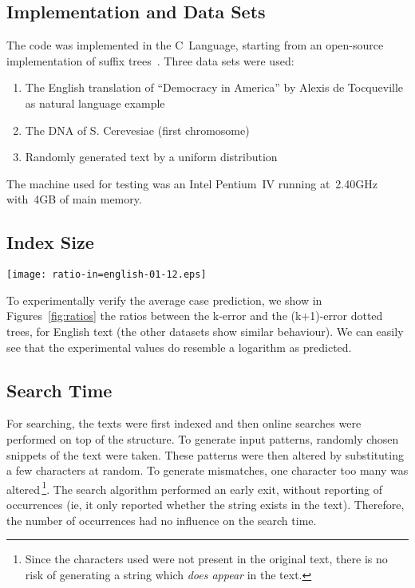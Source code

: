\subsection{Implementation and Data Sets}

The code was implemented in the C~Language, starting from an open-source implementation of suffix trees~\cite{ansicimplementation}. Three data sets were used:

\begin{enumerate}
\item The English translation of ``Democracy in America'' by Alexis de Tocqueville as natural language example
\item The DNA of S. Cerevesiae (first chromosome)
\item Randomly generated text by a uniform distribution
\end{enumerate}

The machine used for testing was an Intel Pentium~IV running at~2.40GHz with~4GB of main memory.

\subsection{Index Size}

\begin{figure*}%
\centering
\texttt{[image: ratio-in=english-01-12.eps]}%
\caption{Ratio of number of nodes in k-error and (k+1)-error dotted trees}\label{fig:ratios}%
\end{figure*}

To experimentally verify the average case prediction, we show in Figures~\ref{fig:ratios} the ratios between the k-error and the (k+1)-error dotted trees, for English text (the other datasets show similar behaviour). We can easily see that the experimental values do resemble a logarithm as predicted.

\subsection{Search Time}

For searching, the texts were first indexed and then online searches were performed on top of the structure. To generate input patterns, randomly chosen snippets of the text were taken. These patterns were then altered by substituting a few characters at random. To generate mismatches, one character too many was altered\,\footnote{Since the characters used were not present in the original text, there is no risk of generating a string which \emph{does appear} in the text.}. The search algorithm performed an early exit, without reporting of occurrences (ie, it only reported whether the string exists in the text). Therefore, the number of occurrences had no influence on the search time.

